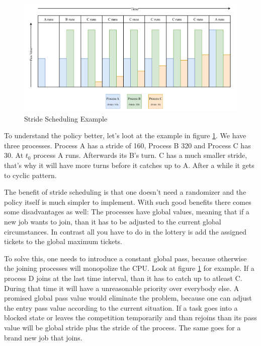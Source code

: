 \begin{figure}[h]
    \centering
    \includegraphics[width=\textwidth]{Assets/Stride-Scheduling.pdf}
    \caption{Stride Scheduling Example}
    \label{fig:stride-scheduling}
\end{figure}

To understand the policy better, let's loot at the example in figure \ref{fig:stride-scheduling}.
We have three processes. Process A has a stride of 160, Process B 320 and Process C has 30. At $t_0$ process A runs. Afterwards its B's turn. C has a much smaller stride, that's why it will have more turns before it catches up to A.
After a while it gets to cyclic pattern.


The benefit of stride scheduling is that one doesn't need a randomizer and the policy itself is much simpler to implement. With such good benefits there comes some disadvantages as well: The processes have global values, meaning that if a new job wants to join, than it has to be adjusted to the current global circumstances. In contrast all you have to do in the lottery is add the assigned tickets to the global maximum tickets.

To solve this, one needs to introduce a constant global pass, because otherwise the joining processes will monopolize the CPU. 
Look at figure \ref{fig:stride-scheduling} for example.
If a process D joins at the last time interval, than it has to catch up to atleast C. During that time it will have a unreasonable priority over everybody else.
A promised global pass value would eliminate the problem, because one can adjust the entry pass value according to the current situation.
If a task goes into a blocked state or leaves the competition temporarily and than rejoins than its pass value will be global stride plus the stride of the process. The same goes for a brand new job that joins.